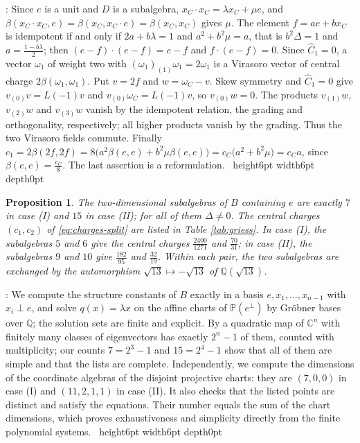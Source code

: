 \documentclass[leqno]{article}
\newcommand{\Cbb}{\ensuremath{\mathbb{C}}}
\newcommand{\qed}{\hfill \vrule height6pt  width6pt depth0pt}
\newtheorem{prop}[thm]{Proposition}
\newenvironment{proof}[1][]{\noindent {\it Proof #1} : }{\hbox{~}\qed
\smallskip
}
\numberwithin{equation}{section}
\begin{document}
\begin{proof}
Since $e$ is a unit and $D$ is a subalgebra, $x_C \cdot x_C = \lambda x_C+\mu e$, and $\beta(x_C \cdot x_C,e) = \beta(x_C,x_C \cdot e) = \beta(x_C,x_C)$ gives $\mu$. The element $f = ae+bx_C$ is idempotent if and only if $2a+b\lambda = 1$ and $a^2+b^2\mu = a$, that is $b^2\Delta = 1$ and $a = \frac{1-b\lambda}{2}$; then $(e-f)\cdot(e-f) = e-f$ and $f \cdot (e-f) = 0$. Since $\widehat C_1 = 0$, a vector $\omega_1$ of weight two with $(\omega_1)_{(1)}\omega_1 = 2\omega_1$ is a Virasoro vector of central charge $2\beta(\omega_1,\omega_1)$. Put $v = 2f$ and $w = \omega_C-v$. Skew symmetry and $\widehat C_1 = 0$ give $v_{(0)}v = L(-1)v$ and $v_{(0)}\omega_C = L(-1)v$, so $v_{(0)}w = 0$. The products $v_{(1)}w$, $v_{(2)}w$ and $v_{(3)}w$ vanish by the idempotent relation, the grading and orthogonality, respectively; all higher products vanish by the grading. Thus the two Virasoro fields commute. Finally $c_1 = 2\beta(2f,2f) = 8\big(a^2\beta(e,e)+b^2\mu\beta(e,e)\big) = c_C\big(a^2+b^2\mu\big) = c_Ca$, since $\beta(e,e) = \frac{c_C}{8}$. The last assertion is a reformulation.
\end{proof}

\begin{prop}
\label{prop:griess-candidates}
The two-dimensional subalgebras of $B$ containing $e$ are exactly $7$ in case (I) and $15$ in case (II); for all of them $\Delta \neq 0$. The central charges $(c_1,c_2)$ of \eqref{eq:charges-split} are listed in Table \ref{tab:griess}. In case (I), the subalgebras $5$ and $6$ give the central charges $\frac{2400}{1271}$ and $\frac{70}{31}$; in case (II), the subalgebras $9$ and $10$ give $\frac{182}{95}$ and $\frac{32}{19}$. Within each pair, the two subalgebras are exchanged by the automorphism $\sqrt{13} \mapsto -\sqrt{13}$ of $\mathbb{Q}(\sqrt{13})$.
\end{prop}

\begin{proof}
We compute the structure constants of $B$ exactly in a basis $e,x_1,\ldots,x_{n-1}$ with $x_i \perp e$, and solve $q(x) = \lambda x$ on the affine charts of $\mathbb P(e^\perp)$ by Gröbner bases over $\mathbb{Q}$; the solution sets are finite and explicit. By \cite[Theorem 1.2 p.~2]{CaS13} a quadratic map of $\Cbb^n$ with finitely many classes of eigenvectors has exactly $2^n-1$ of them, counted with multiplicity; our counts $7 = 2^3-1$ and $15 = 2^4-1$ show that all of them are simple and that the lists are complete. Independently, we compute the dimensions of the coordinate algebras of the disjoint projective charts: they are $(7,0,0)$ in case (I) and $(11,2,1,1)$ in case (II). It also checks that the listed points are distinct and satisfy the equations. Their number equals the sum of the chart dimensions, which proves exhaustiveness and simplicity directly from the finite polynomial systems.
\end{proof}
\end{document}
